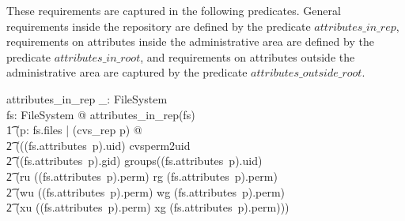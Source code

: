 These requirements are captured in the following predicates.  General
requirements inside the repository are defined by the predicate
$attributes\_in\_rep$, requirements on attributes inside the administrative area
are defined by the predicate $attributes\_in\_root$, and requirements on
attributes outside the administrative area are captured by the predicate
$attributes\_outside\_root$.

\begin{axdef}
  attributes\_in\_rep \_: \power FileSystem \\
\where  
  \forall fs: FileSystem @ attributes\_in\_rep(fs) \iff \\
  \t1 (\forall p: \dom fs.files | (cvs\_rep \prefix p) @ \\
  \t2 (((fs.attributes~p).uid) \in \ran cvsperm2uid \land \\
  \t2 ((fs.attributes~p).gid) \in groups((fs.attributes~p).uid) \land \\
  \t2 (ru \in ((fs.attributes~p).perm) \iff rg \in (fs.attributes~p).perm) \land
  \\ 
  \t2 (wu \in ((fs.attributes~p).perm) \iff wg \in (fs.attributes~p).perm) \land
  \\ 
  \t2 (xu \in ((fs.attributes~p).perm) \iff xg \in (fs.attributes~p).perm))) \\
\end{axdef}
